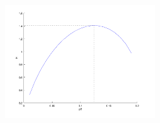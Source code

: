 \begin{questions}
\begin{solution}
  \includegraphics[width=0.5\textwidth]{../images/niquel.pdf}


\end{solution}
\end{questions}
